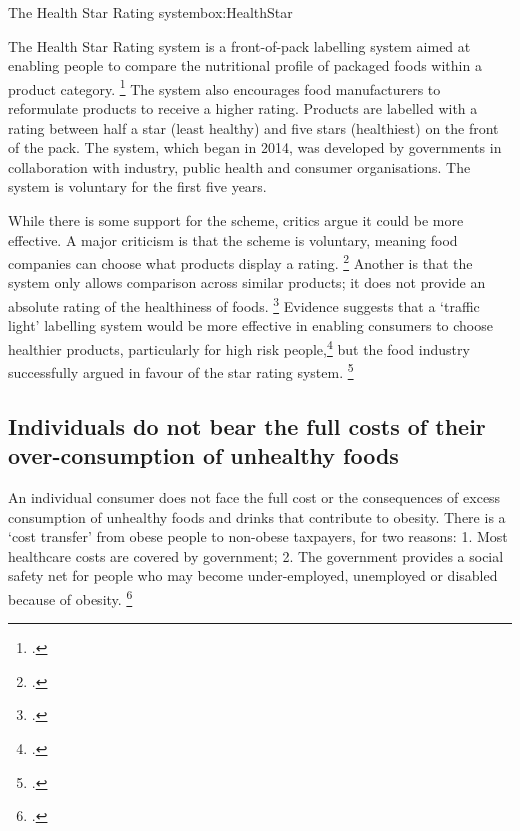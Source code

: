 \documentclass[embargoed]{grattan}
\begin{document}
\begin{smallbox}{The Health Star Rating system}{box:HealthStar}

The Health Star Rating system is a front-of-pack labelling system aimed at enabling people to compare the nutritional profile of packaged foods within a product category.%
\footcite{System2014HealthStarRatings} The system also encourages food manufacturers to reformulate products to receive a higher rating.
Products are labelled with a rating between half a star (least healthy) and five stars (healthiest) on the front of the pack.
The system, which began in 2014, was developed by governments in collaboration with industry, public health and consumer organisations.
The system is voluntary for the first five years.

While there is some support for the scheme, critics argue it could be more effective.
A major criticism is that the scheme is voluntary, meaning food companies can choose what products display a rating.%
\footcite{Clemons2015Howusehealth} Another is that the system only allows comparison across similar products; it does not provide an absolute rating of the healthiness of foods.%
\footcites{Lawrence2015yearonAustralias}{Clemons2015Howusehealth} Evidence suggests that a `traffic light' labelling system would be more effective in enabling consumers to choose healthier products, particularly for high risk people,\footcites{Hawley2013sciencefrontpackage}{Kelly2008Frontpackfood}{Mejean2014Associationperceptionfront}{Turner2014Afterthreeyear} but the food industry successfully argued in favour of the star rating system.%
\footcites{Sacks2011Statesshouldstand}{Gill2011Foodindustrydigs}{Turner2014Afterthreeyear}
\end{smallbox}

\subsection{Individuals do not bear the full costs of their over-consumption of unhealthy foods}\label{individuals-do-not-bear-the-full-costs-of-their-over-consumption-of-unhealthy-foods}

An individual consumer does not face the full cost or the consequences of excess consumption of unhealthy foods and drinks that contribute to obesity.
There is a `cost transfer' from obese people to non-obese taxpayers, for two reasons: 1.
Most healthcare costs are covered by government; 2.
The government provides a social safety net for people who may become under-employed, unemployed or disabled because of obesity.%
\footcites{Karnani2016ObesityCrisisas}{Freebairn2010Taxationobesity}{Koplan2010Responsefoodbeverage}{Brownell2009Ouncespreventionthepublic}{Commission2010ChildhoodObesityEconomic}
\end{document}
